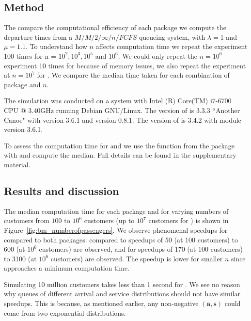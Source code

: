 \documentclass[article]{jss}
\begin{document}
\subsection{Method}

The compare the computational efficiency of each package we compute the departure times from a $M/M/2/\infty/n/FCFS$ queueing system, with $\lambda = 1$ and $\mu = 1.\dot{1}$. To understand how $n$ affects computation time we repeat the experiment 100 times for n = $ 10^2, 10^3, 10^5$ and $10^6 $. We could only repeat the $n = 10^6$ experiment 10 times for  because of memory issues, we also repeat the experiment at $n = 10^7$ for . We compare the median time taken for each combination of package and $n$. 

The simulation was conducted on a system with Intel (R) Core(TM) i7-6700 CPU @ 3.40GHz running Debian GNU/Linux. The version of  is 3.3.3 ``Another Canoe" with  version 3.6.1 and  version 0.8.1. The version of  is 3.4.2 with  module version 3.6.1.

To assess the computation time for  and  we use the  function from the  package \citep{Rpkg_microbenchmark} with  and compute the median. Full details can be found in the supplementary material. 

\subsection{Results and discussion}

The median computation time for each package and for varying numbers of customers from $100$ to $10^6$ customers (up to $10^7$ customers for ) is shown in Figure~\ref{fig:bm_numberofpassengers}. We observe phenomenal speedups for  compared to both packages: compared to  speedups of 50 (at 100 customers) to 600 (at $10^6$ customers) are observed, and for  speedups of 170 (at 100 customers) to 3100 (at $10^6$ customers) are observed. The speedup is lower for smaller $n$ since  approaches a minimum computation time. 

Simulating 10 million customers takes less than 1 second for . We see no reason why queues of different arrival and service distributions should not have similar speedups. This is because, as mentioned earlier, any non-negative $\mathbf{(a,s)}$ could come from two exponential distributions. 
\end{document}
